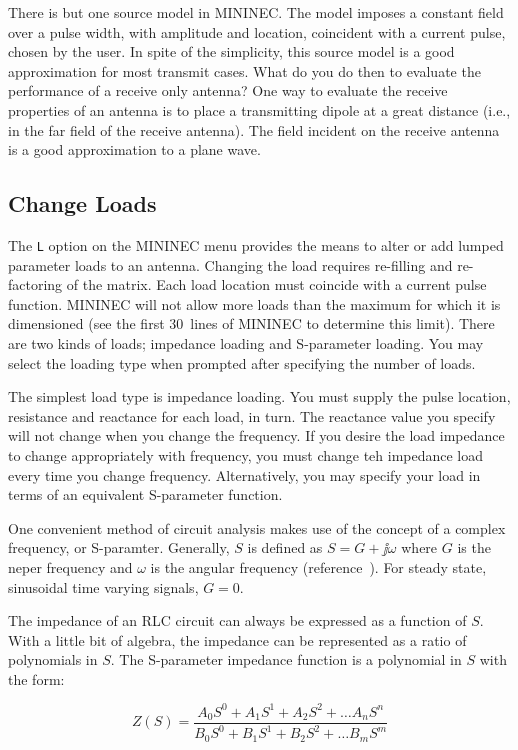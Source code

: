 \documentclass[12pt]{article}
\begin{document}
There is but one source model in MININEC. The model imposes a constant
field over a pulse width, with amplitude and location, coincident with a
current pulse, chosen by the user. In spite of the simplicity, this
source model is a good approximation for most transmit cases. What do
you do then to evaluate the performance of a receive only antenna? One
way to evaluate the receive properties of an antenna is to place a
transmitting dipole at a great distance (i.e., in the far field of the
receive antenna). The field incident on the receive antenna is a good
approximation to a plane wave.

\subsection{Change Loads}
\label{sec-loads}
The \verb+L+ option on the MININEC menu provides the means to alter or
add lumped parameter loads to an antenna. Changing the load requires
re-filling and re-factoring of the matrix. Each load location must
coincide with a current pulse function. MININEC will not allow more
loads than the maximum for which it is dimensioned (see the first
30~lines of MININEC to determine this limit). There are two kinds of
loads; impedance loading and S-parameter loading. You may select the
loading type when prompted after specifying the number of loads.

The simplest load type is impedance loading. You must supply the pulse
location, resistance and reactance for each load, in turn. The reactance
value you specify will not change when you change the frequency. If you
desire the load impedance to change appropriately with frequency, you
must change teh impedance load every time you change frequency.
Alternatively, you may specify your load in terms of an equivalent
S-parameter function.

One convenient method of circuit analysis makes use of the concept of a
complex frequency, or S-paramter. Generally, $S$ is defined as
$S=G+\jj\omega$ where $G$ is the neper frequency and $\omega$ is the
angular frequency (reference~\cite{r24}). For steady state, sinusoidal
time varying signals, $G=0$.

The impedance of an RLC circuit can always be expressed as a function of
$S$. With a little bit of algebra, the impedance can be represented as a
ratio of polynomials in $S$. The S-parameter impedance function is a
polynomial in $S$ with the form:

\[ Z(S) = \frac{A_0S^0+A_1S^1+A_2S^2+\ldots A_nS^n}
               {B_0S^0+B_1S^1+B_2S^2+\ldots B_mS^m}
\]
\end{document}
